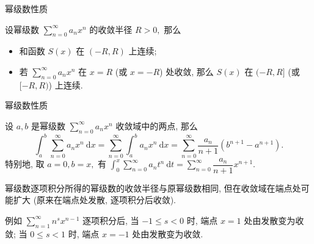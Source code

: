 
\begin{frame}{幂级数性质}

\begin{thm}[和函数的连续性]
设幂级数 $\sum\limits_{n=0}^\infty a_n x^n$ 的收敛半径 $R > 0,$ 那么
\begin{itemize}
\item 和函数 $S(x)$ 在 $(-R, R)$ 上连续;
\item 若 $\sum\limits_{n=0}^\infty a_n x^n$ 在 $x = R$ (或 $x = -R$) 处收敛, 那么 $S(x)$ 在 $(-R, R]$ (或 $[-R, R)$) 上连续.
\end{itemize}
\end{thm}

\end{frame}


\begin{frame}{幂级数性质}

\begin{thm}[逐项可积性]
设 $a, b$ 是幂级数 $\sum\limits_{n=0}^\infty a_n x^n$ 收敛域中的两点, 那么
\vspace{-0.7em}
\[\int_a^b \sum\limits_{n=0}^\infty a_n x^n ~ \mathrm{d} x = \sum\limits_{n=0}^\infty \int_a^b a_n x^n ~ \mathrm{d} x = \sum\limits_{n=0}^\infty \dfrac{a_n}{n+1} (b^{n+1} - a^{n+1}).\]
特别地, 取 $a = 0, b = x,$ 有 $\int_0^x \sum\limits_{n=0}^\infty a_n t^n ~ \mathrm{d} t = \sum\limits_{n=0}^\infty \dfrac{a_n}{n+1} x^{n+1}.$
\end{thm}

\pause

\begin{attnblock}
幂级数逐项积分所得的幂级数的收敛半径与原幂级数相同, 但在收敛域在端点处可能扩大 (原来在端点处发散, 逐项积分后收敛).
\end{attnblock}

\pause

例如 $\sum\limits_{n=1}^\infty n^s x^{n-1}$ 逐项积分后, 当 $-1 \leqslant s < 0$ 时, 端点 $x = 1$ 处由发散变为收敛; 当 $0 \leqslant s < 1$ 时, 端点 $x = -1$ 处由发散变为收敛.

\end{frame}


